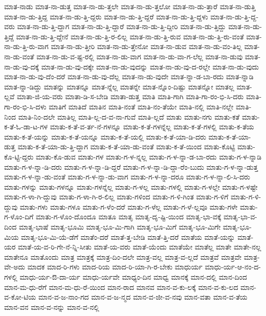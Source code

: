 {ಮಾತ-ನಾಡು
ಮಾತ-ನಾ-ಡುತ್ತ
ಮಾತ-ನಾ-ಡು-ತ್ತಲೇ
ಮಾತ-ನಾ-ಡು-ತ್ತಲೋ
ಮಾತ-ನಾ-ಡು-ತ್ತಾರೆ
ಮಾತ-ನಾ-ಡುತ್ತಿ
ಮಾತ-ನಾ-ಡು-ತ್ತಿದ್ದ
ಮಾತ-ನಾ-ಡು-ತ್ತಿ-ದ್ದರು
ಮಾತ-ನಾ-ಡು-ತ್ತಿ-ದ್ದರೆ
ಮಾತ-ನಾ-ಡು-ತ್ತಿ-ದ್ದಳು
ಮಾತ-ನಾ-ಡು-ತ್ತಿ-ದ್ದ-ವರು
ಮಾತ-ನಾ-ಡು-ತ್ತಿ-ದ್ದಾಗ
ಮಾತ-ನಾ-ಡು-ತ್ತಿ-ದ್ದಾರೆ
ಮಾತ-ನಾ-ಡು-ತ್ತಿ-ದ್ದೀರಿ
ಮಾತ-ನಾ-ಡು-ತ್ತಿದ್ದು
ಮಾತ-ನಾ-ಡು-ತ್ತಿದ್ದೆ
ಮಾತ-ನಾ-ಡು-ತ್ತಿ-ದ್ದೇನೆ
ಮಾತ-ನಾ-ಡು-ತ್ತಿ-ರ-ಲಿಲ್ಲ
ಮಾತ-ನಾ-ಡು-ತ್ತಿ-ರುವ
ಮಾತ-ನಾ-ಡು-ತ್ತಿ-ರು-ವಂತೆ
ಮಾತ-ನಾ-ಡು-ತ್ತಿ-ರು-ವಾಗ
ಮಾತ-ನಾ-ಡು-ತ್ತೀರಿ
ಮಾತ-ನಾ-ಡು-ತ್ತೇನೋ
ಮಾತ-ನಾ-ಡುವ
ಮಾತ-ನಾ-ಡು-ವಂ-ತಿಲ್ಲ
ಮಾತ-ನಾ-ಡು-ವಂತೆ
ಮಾತ-ನಾ-ಡು-ವ-ಷ್ಟ-ರಲ್ಲಿ
ಮಾತ-ನಾ-ಡು-ವಾಗ
ಮಾತ-ನಾ-ಡು-ವಾ-ಗ-ಲೆಲ್ಲ
ಮಾತ-ನಾ-ಡುವು
ಮಾತ-ನಾ-ಡು-ವು-ದಕ್ಕೆ
ಮಾತ-ನಾ-ಡು-ವು-ದಕ್ಕೇ
ಮಾತ-ನಾ-ಡು-ವುದನ್ನು
ಮಾತ-ನಾ-ಡು-ವು-ದ-ರಲ್ಲೇ
ಮಾತ-ನಾ-ಡು-ವುದು
ಮಾತ-ನಾ-ಡು-ವು-ದೆಂ-ದರೆ
ಮಾತ-ನಾ-ಡು-ವು-ದೆಲ್ಲ
ಮಾತ-ನಾ-ಡು-ವುದೇ
ಮಾತ-ನ್ನಾ-ಡ-ಬಾ-ರದು
ಮಾತ-ನ್ನಾಡಿ
ಮಾತ-ನ್ನಾ-ಡಿದ್ದು
ಮಾತನ್ನು
ಮಾತನ್ನೂ
ಮಾತ-ನ್ನೆಲ್ಲ
ಮಾತನ್ನೇ
ಮಾತ-ನ್ನೊಂ-ದಿಷ್ಟು
ಮಾತನ್ನೋ
ಮಾತಲ್ಲ
ಮಾತ-ಲ್ಲವೆ
ಮಾತಾ-ಜಿ-ಯ-ವರು
ಮಾತಾ-ಡಿ-ಸ-ಬೇಡಿ
ಮಾತಾ-ಡುತ್ತ
ಮಾತಿ
ಮಾತಿ-ಗಾಗಿ
ಮಾತಿ-ಗಾ-ರಂ-ಭಿ-ಸಿ-ದರು
ಮಾತಿ-ಗಾ-ರಂ-ಭಿ-ಸಿ-ದಳು
ಮಾತಿಗೆ
ಮಾತಿದೆ
ಮಾತಿನ
ಮಾತಿ-ನಂತೆ
ಮಾತಿ-ನಂ-ತೆಯೇ
ಮಾತಿ-ನಲ್ಲಿ
ಮಾತಿ-ನಲ್ಲೇ
ಮಾತಿ-ನಿಂದ
ಮಾತಿ-ನಿಂ-ದಲೇ
ಮಾತಿಲ್ಲ
ಮಾತಿ-ಲ್ಲ-ದ-ವ-ನಾ-ಗುವೆ
ಮಾತಿ-ಲ್ಲದೆ
ಮಾತು
ಮಾತು-ನಗು
ಮಾತು-ಕತೆ
ಮಾತು-ಕ-ತೆ-ಓ-ಡಾ-ಟ-ಗಳ
ಮಾತು-ಕ-ತೆ-ವ-ರ್ತ-ನೆ-ಗಳನ್ನೂ
ಮಾತು-ಕ-ತೆ-ಗಳನ್ನೆಲ್ಲ
ಮಾತು-ಕ-ತೆ-ಗಳಲ್ಲಿ
ಮಾತು-ಕ-ತೆಯ
ಮಾತು-ಕ-ತೆ-ಯನ್ನು
ಮಾತು-ಕ-ತೆ-ಯನ್ನೂ
ಮಾತು-ಕ-ತೆ-ಯಲ್ಲಿ
ಮಾತು-ಕ-ತೆ-ಯಾ-ಡಿ-ದರು
ಮಾತು-ಕ-ತೆ-ಯಾ-ಡುತ್ತ
ಮಾತು-ಕ-ತೆ-ಯಾ-ಡು-ತ್ತಿ-ದ್ದಾಗ
ಮಾತು-ಕ-ತೆ-ಯಾ-ಡು-ವಂತೆ
ಮಾತು-ಕ-ತೆ-ಯಿಂದ
ಮಾತು-ಕೊಟ್ಟಿ
ಮಾತು-ಕೊ-ಟ್ಟಿ-ದ್ದರು
ಮಾತು-ಕೊ-ಡುವ
ಮಾತು-ಗಳ
ಮಾತು-ಗ-ಳ-ನ್ನಲ್ಲ
ಮಾತು-ಗ-ಳ-ನ್ನಾ-ಡ-ಬಾ-ರದು
ಮಾತು-ಗ-ಳ-ನ್ನಾಡಿ
ಮಾತು-ಗ-ಳ-ನ್ನಾ-ಡಿ-ದರು
ಮಾತು-ಗ-ಳ-ನ್ನಾ-ಡಿ-ದ್ದರೆ
ಮಾತು-ಗ-ಳ-ನ್ನಾ-ಡಿ-ದ್ದಾ-ರೆಂ-ಬುದು
ಮಾತು-ಗ-ಳ-ನ್ನಾ-ಡುತ್ತ
ಮಾತು-ಗ-ಳ-ನ್ನಾ-ಡು-ವಂತೆ
ಮಾತು-ಗ-ಳ-ನ್ನಾ-ಡು-ವಾಗ
ಮಾತು-ಗ-ಳ-ನ್ನಾ-ದರೂ
ಮಾತು-ಗ-ಳ-ನ್ನಾ-ಲಿ-ಸಿ-ದರು
ಮಾತು-ಗಳನ್ನು
ಮಾತು-ಗಳನ್ನೂ
ಮಾತು-ಗಳನ್ನೆಲ್ಲ
ಮಾತು-ಗ-ಳಲ್ಲ
ಮಾತು-ಗಳಲ್ಲಿ
ಮಾತು-ಗ-ಳಲ್ಲೇ
ಮಾತು-ಗ-ಳಷ್ಟೇ
ಮಾತು-ಗ-ಳಾ-ಗಿ-ದ್ದುವು
ಮಾತು-ಗ-ಳಾ-ಗಿ-ರ-ಲಿಲ್ಲ
ಮಾತು-ಗಳಿಂದ
ಮಾತು-ಗ-ಳಿ-ಗಿಂತ
ಮಾತು-ಗ-ಳಿಗೆ
ಮಾತು-ಗ-ಳಿ-ದ್ದುವು
ಮಾತು-ಗಳು
ಮಾತು-ಗಳೂ
ಮಾತು-ಗ-ಳೆಂ-ದರೆ
ಮಾತು-ಗ-ಳೆಲ್ಲ
ಮಾತು-ಗ-ಳೆ-ಲ್ಲವೂ
ಮಾತು-ಗಳೇ
ಮಾತು-ಗ-ಳೊಂ-ದಿಗೆ
ಮಾತು-ಗ-ಳೊಂ-ದೊಂದೂ
ಮಾತೂ
ಮಾತೃ
ಮಾತೃ-ದೃ-ಷ್ಟಿ-ಯಿಂದ
ಮಾತೃ-ಭಾ-ವಕ್ಕೆ
ಮಾತೃ-ಭಾ-ವ-ದಿಂದ
ಮಾತೃ-ಭಾಷೆ
ಮಾತೃ-ಭೂಮಿ
ಮಾತೃ-ಭೂ-ಮಿ-ಗಾಗಿ
ಮಾತೃ-ಭೂ-ಮಿಗೆ
ಮಾತೃ-ಭೂ-ಮಿಗೇ
ಮಾತೃ-ಭೂ-ಮಿಯ
ಮಾತೃ-ಭೂ-ಮಿ-ಯೆ-ಡೆಗೆ
ಮಾತೆಂ-ದರೆ
ಮಾತೆ-ತ್ತ-ಬೇಡಿ
ಮಾತೆ-ತ್ತಿ-ದರೆ
ಮಾತೆಯ
ಮಾತೆ-ಯನ್ನು
ಮಾತೆ-ಯರ
ಮಾತೆ-ಯ-ವ-ರಿ-ಗೇ-ನೆ-ನ್ನಿ-ಸೀತು
ಮಾತೆ-ಯ-ವರು
ಮಾತೆ-ಯೆಂದು
ಮಾತೆಯೇ
ಮಾತೆಲ್ಲ
ಮಾತೇ
ಮಾತೇ-ನಲ್ಲ
ಮಾತೇನೂ
ಮಾತೊಂದು
ಮಾತ್ರ
ಮಾತ್ರಕ್ಕೆ
ಮಾತ್ರ-ದಿಂ-ದಲೇ
ಮಾತ್ರ-ವಲ್ಲ
ಮಾತ್ರ-ವ-ಲ್ಲದೆ
ಮಾತ್ರವೆ
ಮಾತ್ರವೇ
ಮಾತ್ರ-ವೇ-ಅದು
ಮಾದಕ
ಮಾದ-ರಿ-ಗಳು
ಮಾದ-ರಿಯ
ಮಾದ-ರಿ-ಯಾ-ಗಿ-ರ-ಬೇಕು
ಮಾಧುರ್ಯ
ಮಾಧು-ರ್ಯ-ಆ-ನಂ-ದ-ಗಳಲ್ಲಿ
ಮಾಧು-ರ್ಯ-ಔ-ದಾ-ರ್ಯ
ಮಾಧು-ರ್ಯವೇ
ಮಾಧ್ಯಂ-ದಿನ
ಮಾಧ್ವ
ಮಾನಕ್ಕೆ
ಮಾನ-ದಲ್ಲಿ
ಮಾನ-ದಿಂದ
ಮಾನ-ಮ-ಧು-ರೆಗೆ
ಮಾನ-ಮ-ಧು-ರೆ-ಯಿಂದ
ಮಾನ-ರಾದ
ಮಾನವ
ಮಾನ-ವ-ಕು-ಲಕ್ಕೆ
ಮಾನ-ವ-ಕು-ಲದ
ಮಾನ-ವ-ಕೋ-ಟಿಯ
ಮಾನ-ವ-ಜ-ನಾಂ-ಗದ
ಮಾನ-ವ-ಜ-ನ್ಮದ
ಮಾನ-ವ-ಜೀ-ವ-ನವು
ಮಾನ-ವತಾ
ಮಾನ-ವ-ತೆಯ
ಮಾನ-ವನ
ಮಾನ-ವ-ನನ್ನು
ಮಾನ-ವ-ನಲ್ಲಿ
}
